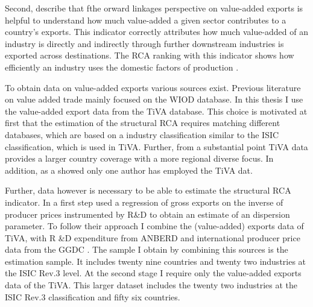  Second, \textcite{wang2013} describe that  fthe orward linkages perspective on value-added exports is helpful to understand how much value-added a given sector contributes to a country's exports.  This indicator correctly attributes how much value-added of an industry is directly  and indirectly through further downstream industries is exported across destinations.  The RCA ranking with this indicator shows how efficiently an industry uses the domestic factors of production  \textcite{bladwin}. %
\par %
To obtain data on value-added exports various sources exist. Previous literature on value added trade mainly focused on the WIOD \textcite{Timmer2012} database. In this thesis I use the value-added export data from the TiVA \textcite{tiva2} database. This choice is motivated at first that the estimation of the structural RCA requires matching different databases, which are based on a industry classification similar to the ISIC classification, which is used in TiVA. Further, from a substantial point TiVA data provides a larger country coverage with a more regional diverse focus. In addition, as a \textcite{johnson} showed only one author has employed the TiVA dat. \par
Further, data however is necessary to be able to estimate the structural RCA indicator. In a first step \textcite{costinot}  used a regression of gross exports on the inverse of producer prices instrumented by R\&D to obtain an estimate of an dispersion parameter. To follow their approach I combine  the (value-added) exports data of \textcite{tiva2} TiVA, with  R \&D expenditure from \textcite{stan2} ANBERD and  international producer price data from the GGDC  \parencite{Inklaar2012}. The sample I obtain by combining this sources is the estimation sample. It includes twenty nine countries and twenty two industries at the ISIC Rev.3 level. At the second stage I require only the value-added exports data of the TiVA. This larger dataset includes the twenty two industries at the ISIC Rev.3 classification and fifty six countries.
